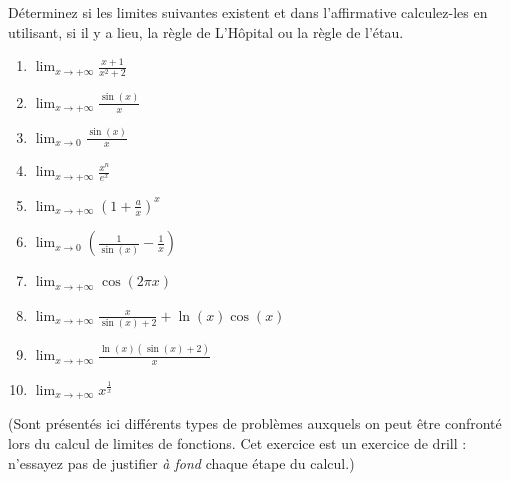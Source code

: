 
\begin{exercice}\label{exo0023}

Déterminez si les limites suivantes existent et dans l'affirmative calculez-les en utilisant, si il y a lieu, la règle de L'Hôpital ou la règle de l'étau. 
\begin{multicols}{2}
\begin{enumerate}
	\item $ \lim_{x \rightarrow  +\infty} \frac{x+1}{x^2+2}$
	\item $ \lim_{x \rightarrow  +\infty} \frac{\sin(x)}{x} $
	\item $ \lim_{x \rightarrow  0} \frac{\sin(x)}{x} $
	\item $ \lim_{x \rightarrow  +\infty}  \frac{x ^n}{e ^x} $
	\item $ \lim_{x \rightarrow  +\infty} (1 + \frac{a}{x})^x $
	\item $ \lim_{x \rightarrow  0} (\frac{1}{\sin(x)} - \frac{1}{x} )$
	\item $ \lim_{x \rightarrow  +\infty} \cos( 2 \pi x) $
	\item\label{Item0023h} $ \lim_{x \rightarrow  +\infty} \frac{x}{\sin(x)+2} + \ln(x)\cos(x) $
	\item $ \lim_{x \rightarrow  +\infty} \frac{ \ln(x)(\sin(x) + 2)}{x} $
	\item $ \lim_{x \rightarrow  +\infty} x ^\frac{1}{x} $
\end{enumerate}
\end{multicols}
%
(Sont présentés ici différents types de problèmes auxquels on peut être confronté lors du calcul de limites de fonctions. Cet exercice est un exercice de drill : n'essayez pas de justifier \emph{à fond} chaque étape du calcul.)
%

\end{exercice}
